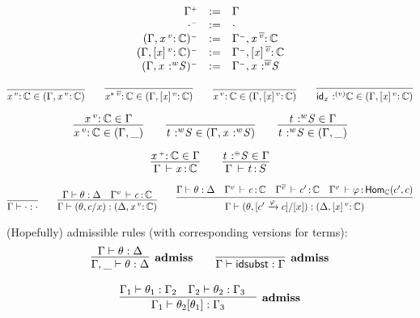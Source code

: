 \documentclass[11pt]{article}
\theoremstyle{plain}
\begin{document}
\[
\begin{array}{rcl}
\Gamma^{{\text{\tiny $\mathord{+}$}}} & := & \Gamma \\
\cdot^{{\text{\tiny $\mathord{-}$}}} & := & \cdot \\
({\Gamma},\mathit{x} \,^{v}{:}^{\,} \mathit{\mathbb{C}})^{{\text{\tiny $\mathord{-}$}}} & := & {\Gamma^{{\text{\tiny $\mathord{-}$}}}},\mathit{x} \,^{\overline{v}}{:}^{\,} \mathit{\mathbb{C}} \\
({\Gamma},[\mathit{x}] \,^{v}{:}^{\,} \mathit{\mathbb{C}})^{{\text{\tiny $\mathord{-}$}}} & := & {\Gamma^{{\text{\tiny $\mathord{-}$}}}},[\mathit{x}] \,^{\overline{v}}{:}^{\,} \mathit{\mathbb{C}} \\
({\Gamma},\mathit{x} \,^{\,}{:}^{w} \mathit{S})^{{\text{\tiny $\mathord{-}$}}} & := & {\Gamma^{{\text{\tiny $\mathord{-}$}}}},\mathit{x} \,^{\,}{:}^{\overline{w}} \mathit{S} \\
\end{array}
\]

\[
\infer{\catvar{x}{v}{\C} \in (\Gamma,\catvar{x}{v}{\C})}
      {}
\qquad
\infer{\catvar{x^*}{\flip v}{\C} \in (\Gamma,\twcatvar{x}{v}{\C})}
      {}
\qquad
\infer{\catvar{x}{v}{\C} \in (\Gamma,\twcatvar{x}{v}{\C})}
      {}
\qquad
\infer{\tpvar{\idm x}{(v)}{\C} \in (\Gamma,\twcatvar{x}{v}{\C})}
      {}
\]

\[
\infer{\catvar{x}{v}{\C} \in (\Gamma,\_)}
      {\catvar{x}{v}{\C} \in \Gamma}
\qquad
\infer{\tpvar{t}{w}{S} \in (\Gamma,\tpvar{x}{w}{S})}
      {}
\qquad
\infer{\tpvar{t}{w}{S} \in (\Gamma,\_)}
      {\tpvar{t}{w}{S} \in \Gamma}
\]

\[
\infer{\ofdtp{\Gamma}{x}{\C}}{\catvar{x}{\co}{\C} \in \Gamma}
\qquad
\infer{\oftp{\Gamma}{t}{S}}
      {\tpvar{t}{\coc}{S} \in \Gamma}
\]

\[
\infer{\wfsub{\Gamma}{\cdot}{\cdot}}{} 
\qquad
\infer{\wfsub{\Gamma}{(\theta,c/x)}{(\Delta,\catvar{x}{v}{\C})}}
      {\wfsub{\Gamma}{\theta}{\Delta} & 
        \ofdtp{\Gamma^v}{c}{\C}
      }
\qquad
\infer{\wfsub{\Gamma}{(\theta,\substtw{c'}{c}{\vfi}{x})}{(\Delta,\twcatvar{x}{v}{\C})}}
      {\wfsub{\Gamma}{\theta}{\Delta} & 
        \ofdtp{\Gamma^v}{c}{\C} &
        \ofdtp{\Gamma^{\flip v}}{c'}{\C} &
        \oftp{\Gamma^v}{\vfi}{\Hom{\C}{c'}{c}}
      }
\]

(Hopefully) admissible rules (with corresponding versions for terms):   
\[
\begin{array}{c}
\infer[\admiss]
      {\wfsub{\Gamma,\_}{\theta}{\Delta}}
      {\wfsub{\Gamma}{\theta}{\Delta}}
\qquad
\infer[\admiss]
      {\wfsub{{\Gamma}}{\idsubst}{\Gamma}}
      {}
\\ \\
\infer[\admiss]
      {\wfsub{{\Gamma_1}}{\tsubst{\theta_2}{\theta_1}}{\Gamma_3}}
      {\wfsub{{\Gamma_1}}{\theta_1}{\Gamma_2} &
        \wfsub{{\Gamma_2}}{\theta_2}{\Gamma_3} &
      }
\end{array}
\]
\end{document}
